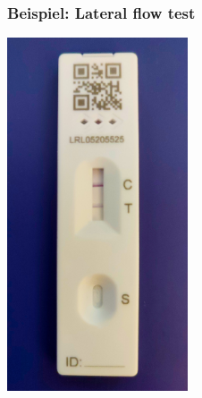 \documentclass{beamer}
\begin{document}
\begin{frame}
\end{frame}



\begin{frame}
\frametitle{Beispiel: Lateral flow test}

\begin{center}
\includegraphics[width=0.4\textwidth, angle=-90, origin=c]{covid_test.jpg}
\end{center}

\end{frame}
\end{document}
